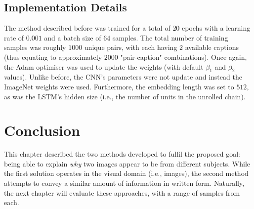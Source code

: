 \subsection{Implementation Details}
\label{subsec:chap3_method_b_implementation_details}
The method described before was trained for a total of $20$ epochs with a learning rate of $0.001$ and a batch size of $64$ samples. The total number of training samples was roughly $1000$ unique pairs, with each having $2$ available captions (thus equating to approximately $2000$ "pair-caption" combinations). Once again, the Adam optimiser was used to update the weights (with default $\beta_1$ and $\beta_2$ values). Unlike before, the \ac{CNN}'s parameters were not update and instead the ImageNet weights were used. Furthermore, the embedding length was set to $512$, as was the \ac{LSTM}'s hidden size (i.e., the number of units in the unrolled chain).

\section{Conclusion}
\label{sec:chap3_conclusion}

This chapter described the two methods developed to fulfil the proposed goal: being able to explain \textit{why} two images appear to be from different subjects. While the first solution operates in the visual domain (i.e., images), the second method attempts to convey a similar amount of information in written form. Naturally, the next chapter will evaluate these approaches, with a range of samples from each.